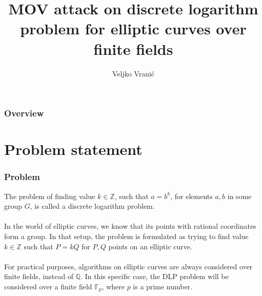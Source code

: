 \documentclass{beamer}
\title[MOV attack on DLP for $E/\mathbb{F}_p$]{MOV attack on discrete logarithm problem for elliptic curves over finite fields} %
\author{Veljko Vranić} %
\institute[] %
{
Elliptic curves and cryptography course \\ %
\medskip
\textit{byblos94@gmail.com}
\date{\today} %
}
\begin{document}
\begin{frame}
\titlepage %
\end{frame}

\begin{frame}
\frametitle{Overview} %
\tableofcontents %
\end{frame}


\section{Problem statement} %

\begin{frame}
\frametitle{Problem}

The problem of finding value $k \in \mathbb{Z}$, such that $a = b^k$, for elements $a, b $ in some group $G$, is called a discrete logarithm problem.\\~\\

In the world of elliptic curves, we know that its points with rational coordinates form a group.
In that setup, the problem is formulated as trying to find value $k \in \mathbb{Z}$ such that $P=kQ$ for $P, Q$ points on an elliptic curve.  \\ ~ \\ 

For practical purposes, algorithms on elliptic curves are always considered over finite fields, instead of $\mathbb{Q}$. In this specific case, the DLP problem will be considered over a finite field $\mathbb{F}_p$, where $p$ is a prime number.
\end{frame}
\end{document}
